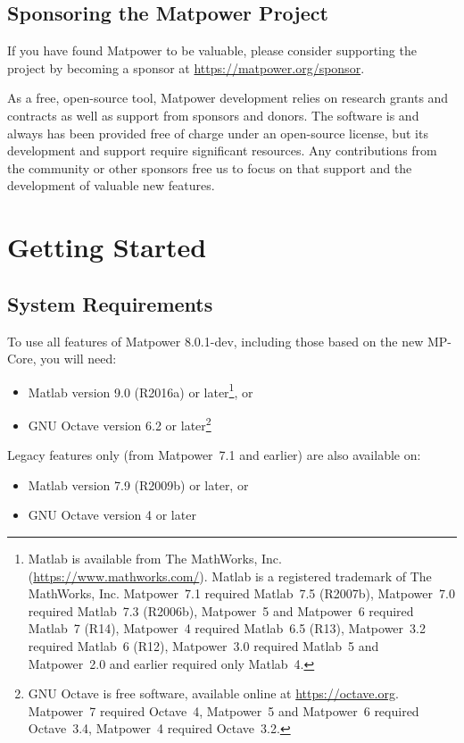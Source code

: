 \documentclass[12pt]{article}
\newcommand{\mpver}[0]{8.0.1-dev}
\newcommand{\matlab}[0]{{\sc Matlab}}
\newcommand{\matpower}[0]{{\sc Matpower}}
\newcommand{\mpcore}{{MP-Core}}
\numberwithin{equation}{section}
\numberwithin{table}{section}
\numberwithin{figure}{section}
\begin{document}
\subsection{Sponsoring the \matpower{} Project}
\label{sec:sponsor}

If you have found \matpower{} to be valuable, please consider supporting the project by becoming a sponsor at \url{https://matpower.org/sponsor}.

As a free, open-source tool, \matpower{} development relies on research grants and contracts as well as support from sponsors and donors. The software is and always has been provided free of charge under an open-source license, but its development and support require significant resources. Any contributions from the community or other sponsors free us to focus on that support and the development of valuable new features.

\clearpage
\section{Getting Started}


\subsection{System Requirements}
\label{sec:sysreq}
To use all features of \matpower{} \mpver{}, including those based on the new \mpcore{}, you will need:
\begin{itemize}
\item \matlab{}\textsuperscript{\tiny \textregistered} version 9.0 (R2016a) or later\footnote{\matlab{} is available from The MathWorks, Inc. (\url{https://www.mathworks.com/}). \matlab{} is a registered trademark of The MathWorks, Inc. \matpower{}~7.1 required \matlab{}~7.5 (R2007b), \matpower{}~7.0 required \matlab{}~7.3 (R2006b), \matpower{}~5 and \matpower{}~6 required \matlab{}~7 (R14), \matpower{}~4 required \matlab{}~6.5 (R13), \matpower{}~3.2 required \matlab{}~6 (R12), \matpower{}~3.0 required \matlab{}~5 and \matpower{}~2.0 and earlier required only \matlab{}~4. }, or
\item GNU Octave version 6.2 or later\footnote{GNU Octave \cite{octave} is free software, available online at \url{https://octave.org}. \matpower{}~7 required Octave~4, \matpower{}~5 and \matpower{}~6 required Octave~3.4, \matpower{}~4 required Octave~3.2.}
\end{itemize}
Legacy features only (from \matpower{}~7.1 and earlier) are also available on:
\begin{itemize}
\item \matlab{} version 7.9 (R2009b) or later, or
\item GNU Octave version 4 or later
\end{itemize}
\end{document}
